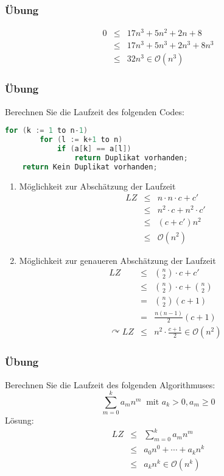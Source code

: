 \subsubsection{Übung}
\begin{eqnarray*}
	0	&\leq& 17n^3 + 5n^2 + 2n + 8 \\
		&\leq& 17n^3 + 5n^3 + 2n^3 + 8n^3 \\
		&\leq& 32n^3 \in \mathcal{O}(n^3)
\end{eqnarray*}

\subsubsection{Übung}
Berechnen Sie die Laufzeit des folgenden Codes:
\begin{lstlisting}[language=java, caption={Pseudocode zur Berechnung der Laufzeit}]
	for (k := 1 to n-1)
		for (l := k+1 to n)
			if (a[k] == a[l])
				return Duplikat vorhanden;
	return Kein Duplikat vorhanden;
\end{lstlisting}
\begin{enumerate}
	\item Möglichkeit zur Abschätzung der Laufzeit
		\begin{eqnarray*}
		LZ 	&\leq& n \cdot n \cdot c + c'	\\
			&\leq& n^2 \cdot c + n^2 \cdot c'	\\
			&\leq& (c+c') n^2				\\
			&\leq& \mathcal{O}(n^{2})
		\end{eqnarray*}
	\item Möglichkeit zur genaueren Abschätzung der Laufzeit
	\begin{eqnarray*}
		LZ	&\leq& \binom{n}{2} \cdot c + c' \\
			&\leq& \binom{n}{2} \cdot c + \binom{n}{2} \\
			&=& \binom{n}{2}(c+1)	\\
			&=& \frac{n(n-1)}{2}(c+1)	\\
	\curvearrowright LZ &\leq& n^{2} \cdot \frac{c+1}{2} \in \mathcal{O}(n^{2})
	\end{eqnarray*}
\end{enumerate}

\subsubsection{Übung}
Berechnen Sie die Laufzeit des folgenden Algorithmuses:
\[\sum_{m=0}^{k} a_m n^m \;\;\textrm{mit } a_k > 0, a_m \geq 0\]
Lösung:
\begin{eqnarray*}
	LZ	&\leq& \sum_{m=0}^{k} a_m n^m \\
		&\leq& a_0 n^0 + \cdots + a_k n^k \\
		&\leq& a_k n^k \in \mathcal{O}(n^k)
\end{eqnarray*}

